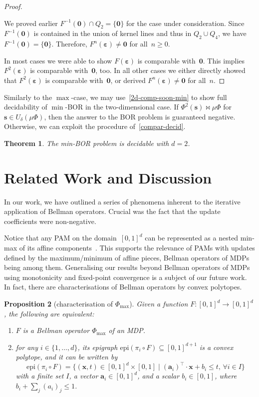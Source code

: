 \documentclass[preprint,12pt]{elsarticle}
\theoremstyle{plain}
\newtheorem{theorem}{Theorem}[section]
\newtheorem{proposition}[theorem]{Proposition}
\theoremstyle{definition}
\theoremstyle{remark}
\theoremstyle{claimstyle}
\newcommand{\eps}{\bm{\varepsilon}}
\begin{document}
\begin{proof}
\begin{enumerate}
		We proved earlier $F^{-1}(\bm{0}) \cap Q_2 = \{\bm{0}\}$ for the case under consideration.
		Since $F^{-1}(\bm{0})$ is contained in the union of kernel lines and thus in $Q_2 \cup Q_4$, we have $F^{-1}(\bm{0}) = \{\bm{0}\}$.
		Therefore, $F^n(\eps) \neq \bm{0}$ for all~$n\geq 0$.
	\end{enumerate}
	
	In most cases we were able to show $F(\eps)$ is comparable with~$\bm{0}$. This implies $F^2(\eps)$ is comparable with~$\bm{0}$, too.
	In all other cases we either directly showed that $F^2(\eps)$ is comparable with~$\bm{0}$, or derived $F^n(\eps) \neq \bm{0}$ for all~$n$.
\end{proof}
Similarly to the $\max$-case, 
we may use~\cref{2d-comp-soon-min} to show full decidability of $\min$-BOR in the two-dimensional case. 
If $\Phi^2(\bm{s}) \bowtie \mu\Phi$ for $\bm{s} \in U_\delta(\mu\Phi)$, then the answer to the BOR problem is guaranteed negative. Otherwise, we can exploit the procedure of~\cref{compar-decid}.
\begin{theorem}\label{2d-bor-min}
	The min-BOR problem is decidable with $d=2$.
\end{theorem}

\section{Related Work and Discussion}
\label{relatedwork}
In our work, we have outlined a series of phenomena inherent to the iterative application of Bellman operators. 
Crucial was the fact that the update coefficients were non-negative.

Notice that any PAM on the domain~$[0,1]^d$ can be represented as a 
nested min-max of its affine components~\cite{Ovchinnikov2002maxmin,Gorokhovik1994maxmin}.
This supports the relevance of PAMs with updates defined by the maximum/minimum of affine pieces, 
Bellman operators of MDPs being among them.
Generalising our results beyond Bellman operators of MDPs 
using monotonicity and fixed-point convergence is a subject of our future work.
In fact, there are characterisations of Bellman operators by convex polytopes. 
\begin{proposition}[characterisation of $\Phi_{\max}$]
	Given a function $F\colon [0, 1]^d \rightarrow [0, 1]^d$, 
	the following are equivalent:
	\begin{enumerate}
		\item $F$ is a Bellman operator $\Phi_{\max}$ of an MDP.
		\item for any $i\in \{1,\dots, d\}$, its epigraph $\mathrm{epi}(\pi_i \circ F)\subseteq [0, 1]^{d+1}$ is a convex polytope, and 
		it can be written by 
		\[
		\mathrm{epi}(\pi_i \circ F) = \{(\bm{x}, t)\in [0, 1]^d\times [0, 1] \mid (\bm{a}_i)^{\top}\cdot \bm{x} + b_i \leq t,\, \forall i\in I\}
		\]
		with a finite set $I$, a vector $\bm{a}_i\in [0, 1]^d$, and a scalar $b_i\in [0, 1]$, where $b_i + \sum_{j} (a_{i})_j \leq 1$. 
	\end{enumerate}
\end{proposition}
\end{document}
